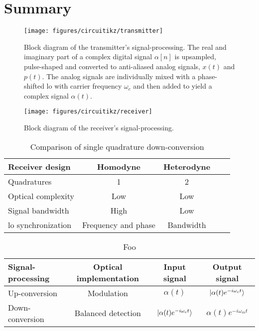 \section*{Summary}

\begin{figure}[htb]
	\centering
	\texttt{[image: figures/circuitikz/transmitter]}
	\caption{Block diagram of the transmitter's signal-processing. The real and imaginary part of a complex digital signal $\alpha[n]$ is upsampled, pulse-shaped and converted to anti-aliased analog signals, $x(t)$ and $p(t)$. The analog signals are individually mixed with a phase-shifted \gls{lo} with carrier frequency $\omega_c$ and then added to yield a complex signal $\alpha(t)$.}\label{fig:transmitter_signal_processing}
\end{figure}

\begin{figure}[htb]
	\centering
	\texttt{[image: figures/circuitikz/receiver]}
	\caption{Block diagram of the receiver's signal-processing.}\label{fig:receiver_signal_processing}
\end{figure}

\begin{table}[htb]
  \centering
  \begin{tabular}{lcccc}
    \toprule
    Receiver design & Homodyne & Heterodyne \\
    \midrule
    Quadratures & \num{1} & \num{2} \\
    Optical complexity & Low & Low \\
    Signal bandwidth & High & Low \\
    \gls{lo} synchronization & Frequency and phase & Bandwidth \\
    \bottomrule
  \end{tabular}
  \caption{Comparison of single quadrature down-conversion}
\end{table}

\begin{table}[htb]
  \centering
  \begin{tabular}{lccc}
    \toprule
    Signal-processing & Optical implementation & Input signal & Output signal \\
    \midrule
    Up-conversion & Modulation & $\alpha(t)$ & $\lvert\alpha(t)e^{-i\omega_c t}\rangle$ \\
    Down-conversion & Balanced detection & $\lvert\alpha(t)e^{-i\omega_c t}\rangle$ & $\alpha(t)e^{-i\omega_mt}$ \\
    \bottomrule
  \end{tabular}
  \caption{Foo}
\end{table}